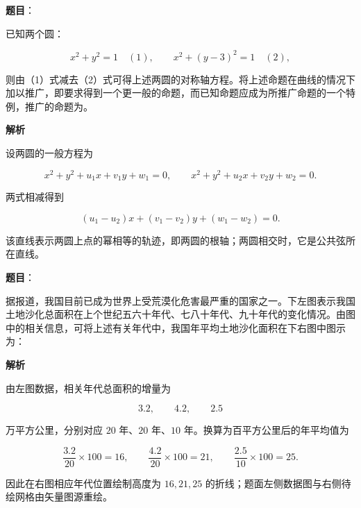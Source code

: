 \begin{answer}

\textbf{题目}：

已知两个圆：

\nopagebreak[4]
\[
x^2+y^2=1\quad(1),\qquad x^2+(y-3)^2=1\quad(2),
\]

则由（1）式减去（2）式可得上述两圆的对称轴方程。将上述命题在曲线的情况下加以推广，即要求得到一个更一般的命题，而已知命题应成为所推广命题的一个特例，推广的命题为\gkblank{}。

\textbf{解析}

设两圆的一般方程为

\nopagebreak[4]
\[
x^2+y^2+u_1x+v_1y+w_1=0,\qquad
x^2+y^2+u_2x+v_2y+w_2=0.
\]

两式相减得到

\nopagebreak[4]
\[
(u_1-u_2)x+(v_1-v_2)y+(w_1-w_2)=0.
\]

该直线表示两圆上点的幂相等的轨迹，即两圆的根轴；两圆相交时，它是公共弦所在直线。


\end{answer}
\begin{answer}

\textbf{题目}：

据报道，我国目前已成为世界上受荒漠化危害最严重的国家之一。下左图表示我国土地沙化总面积在上个世纪五六十年代、七八十年代、九十年代的变化情况。由图中的相关信息，可将上述有关年代中，我国年平均土地沙化面积在下右图中图示为：
\nopagebreak[4]
\begin{center}\end{center}
\nopagebreak[4]
\textbf{解析}

由左图数据，相关年代总面积的增量为

\nopagebreak[4]
\[
3.2,\qquad 4.2,\qquad 2.5
\]

万平方公里，分别对应 $20$ 年、$20$ 年、$10$ 年。换算为百平方公里后的年平均值为

\nopagebreak[4]
\[
\frac{3.2}{20}\times100=16,\qquad
\frac{4.2}{20}\times100=21,\qquad
\frac{2.5}{10}\times100=25.
\]

因此在右图相应年代位置绘制高度为 $16,21,25$ 的折线；题面左侧数据图与右侧待绘网格由矢量图源重绘。


\end{answer}

